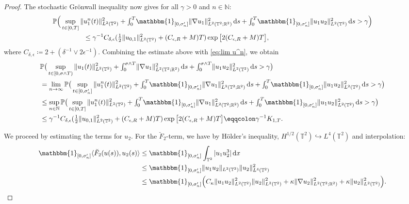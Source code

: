 \documentclass{amsart}
\newcommand{\dd}{\,\mathrm{d}}
\newcommand{\one}{\mathbbm{1}}
\newcommand{\<}{\langle}
\newcommand{\?}{\rangle}
\newcommand{\into}{\hookrightarrow}
\newcommand{\ceqq}{\coloneqq}
\newcommand{\eqqc}{\eqqcolon}
\newcommand{\Tor}{\mathbb{T}}
\renewcommand{\Tor}{\mathbb{T}^2}
\theoremstyle{plain}
\theoremstyle{remark}
\theoremstyle{plain}
\numberwithin{equation}{section}
\def\N{{\mathbb N}}
\def\R{{\mathbb R}}
\renewcommand{\P}{\mathbb{P}}
\begin{document}
\begin{proof}
The stochastic Gr\"onwall inequality \cite[Cor.\ 5.4b)]{geiss24} now gives  
for all $\gamma>0$ and 
$n\in\N$: 
\begin{align*} 
\begin{split}
   \P\Big(\sup_{t\in [0,T]} \|&u_1^n(t)\|_{L^2(\Tor)}^2 +\textstyle{\int_0^T}\one_{[0,\sigma_n']}\|\nabla u_1\|_{L^2(\Tor;\R^2)}^2\dd s+\textstyle{\int_0^T}\one_{[0,\sigma_n']}\|u_1u_2\|_{L^2(\Tor)}^2\dd s>\gamma\Big)\\ 
   &\leq \gamma^{-1}C_{\delta,\epsilon}(\tfrac12\|u_{0,1}\|_{L^2(\Tor)}^2+(C_{\epsilon,R}+M)T)\exp\big[2(C_{\epsilon,R}+M)T\big], 
\end{split}
   \end{align*}
where $C_{\delta,\epsilon}\ceqq  2+ (\delta^{-1}\vee 2\epsilon^{-1})$.  Combining the estimate above with \eqref{eq:lim u^n}, 
we obtain    
\begin{align}\label{eq:u1 final estimate}
\begin{split}
&\P\big(\sup_{t\in [0,\sigma\wedge T)} \|u_1(t)\|_{L^2(\Tor)}^2+\textstyle{\int_0^{\sigma\wedge T}}\|\nabla u_1\|_{L^2(\Tor;\R^2)}^2\dd s+\textstyle{\int_0^{\sigma\wedge T}} \|u_1u_2\|_{L^2(\Tor)}^2\dd s>\gamma\big) \\
&=\lim_{n\to\infty}\P\big(\sup_{t\in [0,\sigma_n']} \|u_1^n(t)\|_{L^2(\Tor)}^2+\textstyle{\int_0^T}\one_{[0,\sigma_n']}\|\nabla u_1\|_{L^2(\Tor;\R^2)}^2\dd s+\textstyle{\int_0^T}\one_{[0,\sigma_n']}\|u_1u_2\|_{L^2(\Tor)}^2\dd s>\gamma\big) \\
&\leq \sup_{n\in\N}\P\big(\sup_{t\in [0,T]} \|u_1^n(t)\|_{L^2(\Tor)}^2+\textstyle{\int_0^T}\one_{[0,\sigma_n']}\|\nabla u_1\|_{L^2(\Tor;\R^2)}^2\dd s+\textstyle{\int_0^T}\one_{[0,\sigma_n']}\|u_1u_2\|_{L^2(\Tor)}^2\dd s>\gamma\big) \\
&\leq \gamma^{-1}C_{\delta,\epsilon}(\tfrac12\|u_{0,1}\|_{L^2(\Tor)}^2+(C_{\epsilon,R}+M)T)\exp\big[2(C_{\epsilon,R}+M)T \big]\eqqc\gamma^{-1} K_{1,T}.
\end{split}
\end{align}  

 

We proceed by estimating the terms for $u_2$. For the  $\breve{F}_2$-term, we have by H\"older's inequality,  $H^{1/2}(\Tor)\into L^4(\Tor)$ and interpolation:
\begin{align}
\one_{[0,\sigma_n']}\<\breve{F}_2(u(s)),u_2(s)\?
&\leq \one_{[0,\sigma_n']}\int_{\Tor}|u_1 u_2 ^3|\dd x\notag\\
&\leq \one_{[0,\sigma_n']}\|u_1u_2\|_{L^2(\Tor)}\|u_2\|_{L^4(\Tor)}^2\notag\\ 
&\leq \one_{[0,\sigma_n']}\Big(C_\kappa\|u_1u_2\|_{L^2(\Tor)}^2\|u_2\|_{L^2(\Tor)}^2+\kappa\|\nabla u_2\|_{L^2(\Tor;\R^2)}^2+\kappa\|u_2\|_{L^2(\Tor)}^2\Big).  \label{eq:u1u2^3}
\end{align}  


\end{proof}
\end{document}
